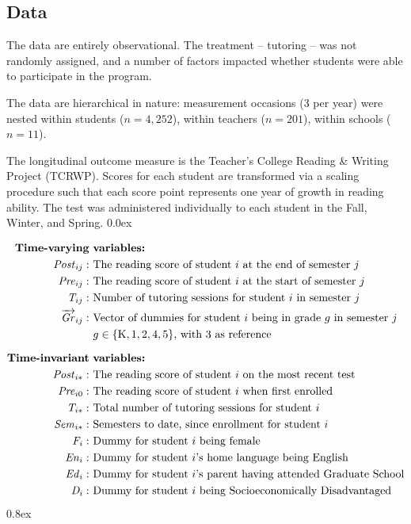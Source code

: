 \documentclass[a0,landscape]{a0poster}
\begin{document}
\begin{multicols}{3}

\subsection*{Data}

The data are entirely observational.
The treatment -- tutoring -- was not randomly assigned,
and a number of factors impacted whether students were able
to participate in the program.

The data are hierarchical in nature:
measurement occasions (3 per year) were nested
within students ($n=4,252$),
within teachers ($n=201$), 
within schools ($n=11$).

The longitudinal outcome measure is the
Teacher's College Reading \& Writing Project (TCRWP).
Scores for each student are transformed via a scaling procedure
such that each score point represents
one year of growth in reading ability.
The test was administered individually to each student
in the Fall, Winter, and Spring.
\parskip 0.0ex

\begin{align*}
\text{\textbf{Time-varying}} & \text{ \textbf{variables:}} \\
\mathit{Post}_{ij}: & \text{ The reading score of student } i \text{ at the end of semester } j \\
\mathit{Pre}_{ij}: & \text{ The reading score of student } i \text{ at the start of semester } j \\
\mathit{T}_{ij}: & \text{ Number of tutoring sessions for student } i  \text{ in semester } j \\
\overrightarrow{\mathit{Gr}}_{ij}: & \text{ Vector of dummies for student } i 
      \text{ being in grade } g \text{ in semester } j \\
  & ~ g \in \{\mathrm{K}, 1, 2, 4, 5\} \text {, with 3 as reference}  \\[1.5ex]
\text{\textbf{Time-invariant}} & \text{ \textbf{variables:}} \\
\mathit{Post}_{i*}: & \text{ The reading score of student } i \text{ on the most recent test } \\
\mathit{Pre}_{i0}: & \text{ The reading score of student } i \text{ when first enrolled } \\
\mathit{T}_{i*}: & \text{ Total number of tutoring sessions for student } i \\
\mathit{Sem}_{i*}: & \text{ Semesters to date, since enrollment for student } i \\
\mathit{F}_{i}: & \text{ Dummy for student } i  \text{ being female } \\ 
\mathit{En}_{i}: & \text{ Dummy for student } i \text{'s home language being English } \\ 
\mathit{Ed}_{i}: & \text{ Dummy for student } i \text{'s parent having attended Graduate School} \\ 
\mathit{D}_{i}: & \text{ Dummy for student } i \text{ being Socioeconomically Disadvantaged } \\ 
\end{align*}
\parskip 0.8ex


\end{multicols}
\end{document}
